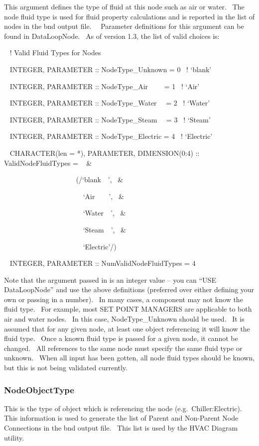 This argument defines the type of fluid at this node such as air or water.~ The node fluid type is used for fluid property calculations and is reported in the list of nodes in the bnd output file.~~ Parameter definitions for this argument can be found in DataLoopNode.~ As of version 1.3, the list of valid choices is:

~ ! Valid Fluid Types for Nodes

~ INTEGER, PARAMETER :: NodeType\_Unknown = 0~ ! `blank'

~ INTEGER, PARAMETER :: NodeType\_Air~~~~ = 1~ ! `Air'

~ INTEGER, PARAMETER :: NodeType\_Water~~ = 2~ ! `Water'

~ INTEGER, PARAMETER :: NodeType\_Steam~~ = 3~ ! `Steam'

~ INTEGER, PARAMETER :: NodeType\_Electric = 4~ ! `Electric'

~ CHARACTER(len = *), PARAMETER, DIMENSION(0:4) :: ValidNodeFluidTypes = ~ \&

~~~~~~~~~~~~~~~~~~~~ (/`blank~~',~ \&

~~~~~~~~~~~~~~~~~~~~~~ `Air~~~~',~ \&

~~~~~~~~~~~~~~~~~~~~~~ `Water~~',~ \&

~~~~~~~~~~~~~~~~~~~~~~ `Steam~~',~ \&

~~~~ ~~~~~~~~~~~~~~~~~~`Electric'/)

~ INTEGER, PARAMETER :: NumValidNodeFluidTypes = 4

Note that the argument passed in is an integer value -- you can ``USE DataLoopNode'' and use the above definitions (preferred over either defining your own or passing in a number).~ In many cases, a component may not know the fluid type.~ For example, most SET POINT MANAGERS are applicable to both air and water nodes.~ In this case, NodeType\_Unknown should be used.~ It is assumed that for any given node, at least one object referencing it will know the fluid type.~ Once a known fluid type is passed for a given node, it cannot be changed.~ All references to the same node must specify the same fluid type or unknown.~ When all input has been gotten, all node fluid types should be known, but this is not being validated currently.

\subsubsection{NodeObjectType}\label{nodeobjecttype}

This is the type of object which is referencing the node (e.g.~Chiller:Electric).~ This information is used to generate the list of Parent and Non-Parent Node Connections in the bnd output file.~ This list is used by the HVAC Diagram utility.

